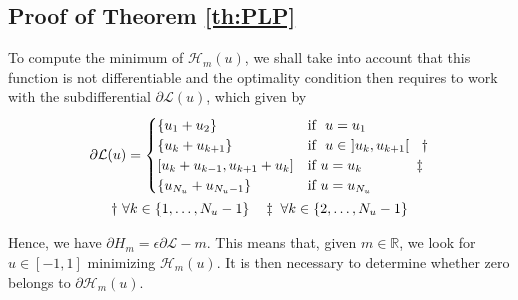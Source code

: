 
\subsection{Proof of Theorem \ref{th:PLP}}\label{proof:PLP}


To compute the minimum of $\mathcal{H}_m(u)$, we shall take into account that this function is not differentiable and the optimality condition then requires to work with the subdifferential $\partial\mathcal{L}(u)$, which given by
\begin{gather}
        \partial\mathcal{L}(u)= \begin{cases}
            \{u_1 + u_2  \}   & \text{if } \ u = u_1 \\
            \{u_k + u_{k+1}\}  & \text{if } \ u \in \ ]u_k,u_{k+1}[ \hspace{0.9em} \dagger\\
            [u_k+u_{k-1} ,  u_{k+1}+u_k] & \text{if} \ u = u_k \hspace{3.9em} \ddagger \\
            \{u_{N_u} + u_{N_u-1}  \} & \text{if} \ u = u_{N_u} 
       \end{cases} \\
       \notag \dagger \ \forall k \in \{1,\dots,N_u-1\} \hspace{1em}
       \notag \ddagger  \ \forall k \in \{2,\dots,N_u-1\}
\end{gather} 

Hence, we have $\partial H_m = \epsilon\partial \mathcal{L} - m$. This means that, given $m\in \mathbb{R}$, we look for $u \in [-1,1]$ minimizing $\mathcal{H}_m(u)$. It is then necessary to determine whether zero belongs to $\partial \mathcal{H}_m(u)$.

